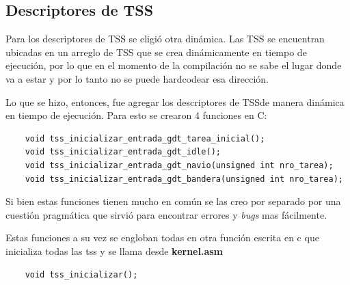\subsection{Descriptores de TSS}

	Para los descriptores de TSS se eligió otra dinámica. Las TSS se encuentran
ubicadas en un arreglo de TSS que se crea dinámicamente en tiempo de ejecución, por lo
que en el momento de la compilación no se sabe el lugar donde va a estar y por lo tanto
no se puede hardcodear esa dirección.

	Lo que se hizo, entonces, fue agregar los descriptores de TSSde manera dinámica en tiempo
de ejecución. Para esto se crearon 4 funciones en C:

\begin{verbatim}
	void tss_inicializar_entrada_gdt_tarea_inicial();
	void tss_inicializar_entrada_gdt_idle();
	void tss_inicializar_entrada_gdt_navio(unsigned int nro_tarea);
	void tss_inicializar_entrada_gdt_bandera(unsigned int nro_tarea);
\end{verbatim}

	Si bien estas funciones tienen mucho en común se las creo por separado
por una cuestión pragmática que sirvió para encontrar errores y \textit{bugs} mas
fácilmente.

	Estas funciones a su vez se engloban todas en otra función escrita en c que
inicializa todas las tss y se llama desde \textbf{kernel.asm}


\begin{verbatim}
	void tss_inicializar();
\end{verbatim}





	

